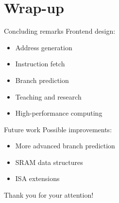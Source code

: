 \documentclass{beamer}
\begin{document}
\section{Wrap-up}

\begin{frame}{Concluding remarks}
  Frontend design:
  \begin{itemize}[<+->]
    \item Address generation
    \item Instruction fetch
    \item Branch prediction
  \end{itemize}

  \begin{itemize}[<+->]
    \item Teaching and research
    \item High-performance computing
  \end{itemize}
\end{frame}

\begin{frame}{Future work}
  Possible improvements:
  \begin{itemize}[<+->]
    \item More advanced branch prediction
    \item SRAM data structures
    \item ISA extensions
  \end{itemize}
\end{frame}

\begin{frame}[standout]
  Thank you for your attention!
\end{frame}
\end{document}
